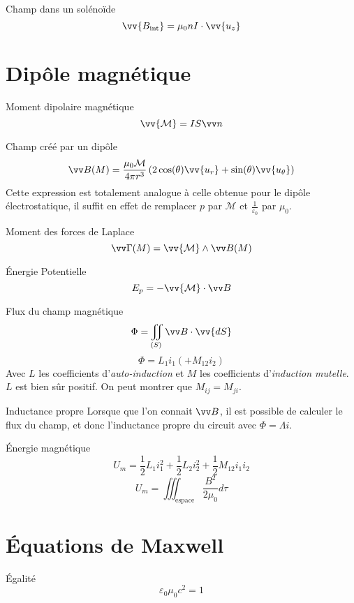 \documentclass[french, a4paper, 11pt, twocolumn]{article}
\newcommand{\inv}[1]{\dfrac{1}{#1}}
\newcommand{\po}{\left(}         %
\newcommand{\pf}{\right)}        %
\newcommand{\pof}[1]{\po #1 \pf} %
\newcommand{\vect}[1]{\vv{#1}}
\newcommand{\uz}{\vect{u_z}}          %
\newcommand{\ur}{\vect{u_r}}          %
\newcommand{\uth}{\vect{u_\theta}}    %
\begin{document}
\begin{cadre}{Champ dans un solénoïde}
  \[\vv{B_{\text{int}}}=\mu_{0}nI\cdot\uz\]
\end{cadre}

\section{Dipôle magnétique}
\begin{cadre}{Moment dipolaire magnétique}
  \[\vv{\mathcal M} = IS\vv n\]
\end{cadre}

\begin{cadre}{Champ créé par un dipôle}
  \[\vv B(M) = \dfrac{\mu_0\mathcal M}{4\pi r^3}\pof{2\cos(\theta)\ur + \sin(\theta)\uth}\]
  Cette expression est totalement analogue à celle obtenue pour le dipôle électrostatique, il suffit en effet de remplacer \(p\) par \(\mathcal M\) et \(\frac{1}{\varepsilon_{0}}\) par \(\mu_{0}\).
\end{cadre}

\begin{cadre}{Moment des forces de Laplace}
\[\vv\Gamma(M) = \vv{\mathcal M}\wedge \vv B(M)\]
\end{cadre}

\begin{cadre}{Énergie Potentielle}
  \[E_{p} = -\vv{\mathcal M}\cdot \vv B\]
\end{cadre}

\begin{cadre}{Flux du champ magnétique}
  \[\Phi = \iint_{(S)}\vv B\cdot\vv{dS}\]
  \[\Phi = L_{1}i_{1} (+ M_{12} i_{2})\]
  Avec \(L\) les coefficients d'\emph{auto-induction} et \(M\) les coefficients d'\emph{induction mutelle}.
  \(L\) est bien sûr positif.
  On peut montrer que \(M_{ij} = M_{ji}\).
\end{cadre}

\begin{cadre}{Inductance propre}
  Lorsque que l'on connait \(\vv B\), il est possible de calculer le flux du champ, et donc l'inductance propre du circuit avec \(\Phi =\Lambda i\).
\end{cadre}

\begin{cadre}{Énergie magnétique}
  \[U_{m} = \inv{2}L_{1}i_{1}^{2}+\inv{2}L_{2}i_{2}^{2}+\inv{2}M_{12}i_{1}i_{2}\]
  \[U_{m} = \iiint_{\text{espace}}\dfrac{B^{2}}{2\mu_{0}}d\tau\]
\end{cadre}

\section{Équations de Maxwell}
\begin{cadre}{Égalité}
  \[\varepsilon_{0}\mu_{0}c^{2}=1\]
\end{cadre}
\end{document}
